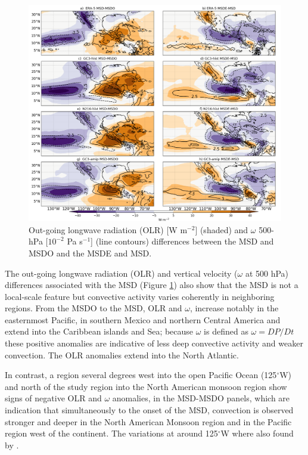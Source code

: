  \begin{figure}[t!]
\includegraphics[width=\linewidth]{figures/fig4_olrv_3.png}
\caption{Out-going longwave radiation (OLR) [W m$^{-2}$] (shaded) and $\omega$ 500-hPa [$10^{-2}$ Pa s$^{-1}$] (line contours) differences between the MSD and MSDO and the MSDE and MSD.}
\label{fig:olranom}
\end{figure}

 The out-going longwave radiation (OLR) and vertical velocity ($\omega$ at 500 hPa) differences associated with the MSD (Figure \ref{fig:olranom}) also show that the MSD is not a local-scale feature but convective activity varies coherently in neighboring regions. From the MSDO to the MSD, OLR and $\omega$, increase notably in the easternmost Pacific, in southern Mexico and northern Central America and extend into the Caribbean islands and Sea; because $\omega$ is defined as $\omega=DP/Dt$  these positive anomalies are indicative of less deep convective activity and weaker convection. The OLR anomalies extend into the North Atlantic. 
 
 In contrast, a region several degrees west into the open Pacific Ocean (125$^\circ$W) and north of the study region into the North American monsoon region show signs of negative OLR and $\omega$ anomalies, in the MSD-MSDO panels, which are indication that simultaneously to the onset of the MSD,  convection is observed stronger and deeper in the North American Monsoon region and in the Pacific region west of the continent. The variations at around 125$^\circ$W where also found by \cite{herrera2015}. 
 
